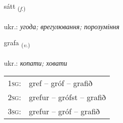 \documentclass[frontgrid, backgrid]{flacards}\usepackage[]{graphicx}\usepackage[]{xcolor}
\begin{document}
\renewcommand{\flhead}{\vskip5pt \fboxsep=0pt {\small\bfseries\footnotesize Nafnorð | іменник}}
\renewcommand{\fcfoot}{\vskip5pt \fboxsep=0pt \hspace{2pt}{\small\bfseries\footnotesize 2K}}

\renewcommand{\blhead}{\vskip5pt {\small\bfseries\footnotesize Nafnorð | іменник }}
\renewcommand{\bcfoot}{\vskip5pt \hspace{2pt}{\small\bfseries\footnotesize 2K}}


{sátt \small{\textsubscript{(\textit{f.})}} \\[1ex] %
\textphonetic{[sauht]} \\
ukr.: \emph{угода; врегулювання; порозуміння} \\  [2ex]
\renewcommand*{\arraystretch}{0.8}
}

\renewcommand{\flhead}{\vskip5pt \fboxsep=0pt {\small\bfseries\footnotesize Sagnorð | дієслово}}
\renewcommand{\fcfoot}{\vskip5pt \fboxsep=0pt \hspace{2pt}{\small\bfseries\footnotesize 2K}}

\renewcommand{\blhead}{\vskip5pt {\small\bfseries\footnotesize Sagnorð | дієслово }}
\renewcommand{\bcfoot}{\vskip5pt \hspace{2pt}{\small\bfseries\footnotesize 2K}}


{grafa \small{\textsubscript{(\textit{v.})}} \\[1ex] %
\textphonetic{[kraːva]} \\
ukr.: \emph{копати; ховати} \\  [2ex]
\renewcommand*{\arraystretch}{0.8}
\begin{tabular}{p{1cm}l}
\textsc{1sg}: & gref -- gróf -- grafið \\ 
\textsc{2sg}: & grefur -- grófst -- grafið \\ 
\textsc{3sg}: & grefur -- gróf -- grafið \\ 
\end{tabular}
}
\end{document}
